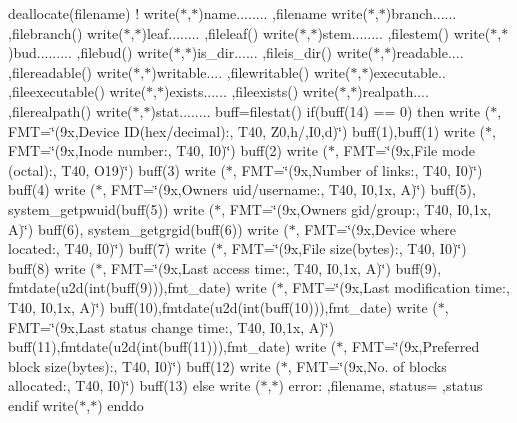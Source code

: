 deallocate(filename) ! write($\ast$,$\ast$)\textquotesingle{}name........ \textquotesingle{},filename write($\ast$,$\ast$)\textquotesingle{}branch...... \textquotesingle{},filebranch() write($\ast$,$\ast$)\textquotesingle{}leaf........ \textquotesingle{},fileleaf() write($\ast$,$\ast$)\textquotesingle{}stem........ \textquotesingle{},filestem() write($\ast$,$\ast$)\textquotesingle{}bud......... \textquotesingle{},filebud() write($\ast$,$\ast$)\textquotesingle{}is\+\_\+dir...... \textquotesingle{},fileis\+\_\+dir() write($\ast$,$\ast$)\textquotesingle{}readable.... \textquotesingle{},filereadable() write($\ast$,$\ast$)\textquotesingle{}writable.... \textquotesingle{},filewritable() write($\ast$,$\ast$)\textquotesingle{}executable.. \textquotesingle{},fileexecutable() write($\ast$,$\ast$)\textquotesingle{}exists...... \textquotesingle{},fileexists() write($\ast$,$\ast$)\textquotesingle{}realpath.... \textquotesingle{},filerealpath() write($\ast$,$\ast$)\textquotesingle{}stat........ \textquotesingle{} buff=filestat() if(buff(14) == 0) then write ($\ast$, F\+MT=\char`\"{}(9x,\textquotesingle{}\+Device I\+D(hex/decimal)\+:\textquotesingle{},      T40, Z0,\textquotesingle{}h/\textquotesingle{},\+I0,\textquotesingle{}d\textquotesingle{})\char`\"{}) buff(1),buff(1) write ($\ast$, F\+MT=\char`\"{}(9x,\textquotesingle{}\+Inode number\+:\textquotesingle{},                T40, I0)\char`\"{}) buff(2) write ($\ast$, F\+MT=\char`\"{}(9x,\textquotesingle{}\+File mode (octal)\+:\textquotesingle{},           T40, O19)\char`\"{}) buff(3) write ($\ast$, F\+MT=\char`\"{}(9x,\textquotesingle{}\+Number of links\+:\textquotesingle{},             T40, I0)\char`\"{}) buff(4) write ($\ast$, F\+MT=\char`\"{}(9x,\textquotesingle{}\+Owner\textquotesingle{}\textquotesingle{}s uid/username\+:\textquotesingle{},       T40, I0,1x, A)\char`\"{}) buff(5), system\+\_\+getpwuid(buff(5)) write ($\ast$, F\+MT=\char`\"{}(9x,\textquotesingle{}\+Owner\textquotesingle{}\textquotesingle{}s gid/group\+:\textquotesingle{},          T40, I0,1x, A)\char`\"{}) buff(6), system\+\_\+getgrgid(buff(6)) write ($\ast$, F\+MT=\char`\"{}(9x,\textquotesingle{}\+Device where located\+:\textquotesingle{},        T40, I0)\char`\"{}) buff(7) write ($\ast$, F\+MT=\char`\"{}(9x,\textquotesingle{}\+File size(bytes)\+:\textquotesingle{},            T40, I0)\char`\"{}) buff(8) write ($\ast$, F\+MT=\char`\"{}(9x,\textquotesingle{}\+Last access time\+:\textquotesingle{},            T40, I0,1x, A)\char`\"{}) buff(9), fmtdate(u2d(int(buff(9))),fmt\+\_\+date) write ($\ast$, F\+MT=\char`\"{}(9x,\textquotesingle{}\+Last modification time\+:\textquotesingle{},      T40, I0,1x, A)\char`\"{}) buff(10),fmtdate(u2d(int(buff(10))),fmt\+\_\+date) write ($\ast$, F\+MT=\char`\"{}(9x,\textquotesingle{}\+Last status change time\+:\textquotesingle{},     T40, I0,1x, A)\char`\"{}) buff(11),fmtdate(u2d(int(buff(11))),fmt\+\_\+date) write ($\ast$, F\+MT=\char`\"{}(9x,\textquotesingle{}\+Preferred block size(bytes)\+:\textquotesingle{}, T40, I0)\char`\"{}) buff(12) write ($\ast$, F\+MT=\char`\"{}(9x,\textquotesingle{}\+No. of blocks allocated\+:\textquotesingle{},     T40, I0)\char`\"{}) buff(13) else write ($\ast$,$\ast$)  error\+: \textquotesingle{},filename,\textquotesingle{} status= \textquotesingle{},status endif write($\ast$,$\ast$) enddo

